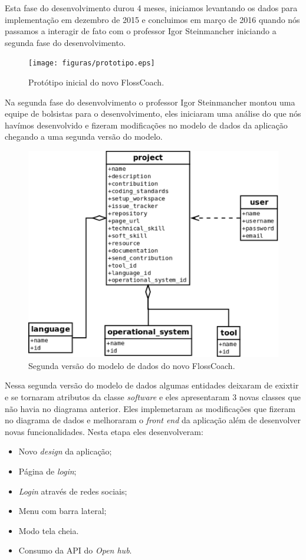 Esta fase do desenvolvimento durou 4 meses, iniciamos levantando os dados para implementação
em dezembro de 2015 e concluimos em março de 2016 quando nós passamos a interagir de fato com o
professor Igor Steinmancher iniciando a segunda fase do desenvolvimento.  

\begin{figure}[h]
	\centering
	\label{fig:prototipo}
		\texttt{[image: figuras/prototipo.eps]}
	\caption{Protótipo inicial do novo FlossCoach.}
\end{figure}

Na segunda fase do desenvolvimento o professor Igor Steinmancher montou uma equipe 
de bolsistas para o desenvolvimento, eles iniciaram uma análise do que nós havímos desenvolvido
e fizeram modificações no modelo de dados da aplicação chegando a uma segunda versão do 
modelo.

\begin{figure}[h]
	\centering
	\label{fig:diagrama_fase2}
		\includegraphics[keepaspectratio=true,scale=0.3]{figuras/diagrama_fase2.eps}
	\caption{Segunda versão do modelo de dados do novo FlossCoach.}
\end{figure}

Nessa segunda versão do modelo de dados algumas entidades deixaram de exixtir e se tornaram
atributos da classe \textit{software} e eles apresentaram 3 novas classes que não havia
no diagrama anterior. Eles implemetaram as modificações que fizeram no diagrama de dados
e melhoraram o \textit{front end} da aplicação além de desenvolver novas funcionalidades. 
Nesta etapa eles desenvolveram:
\begin{itemize}
\item Novo \textit{design} da aplicação;
\item Página de \textit{login}; 
\item \textit{Login} através de redes sociais;
\item Menu com barra lateral;
\item Modo tela cheia.
\item Consumo da API do \textit{Open hub}.
\end{itemize}

